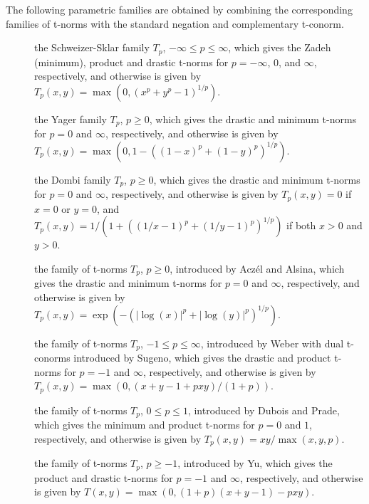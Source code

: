\documentclass[article]{jss}
\newcommand{\eqn}[1]{$#1$}
\begin{document}
\begin{appendix}
  \noindent The following parametric families are obtained by combining the
  corresponding families of t-norms with the standard negation and
  complementary t-conorm.

  \begin{description}
  \item[]{the Schweizer-Sklar family
      \eqn{T_p}, \eqn{-\infty \le p \le \infty}, which
      gives the Zadeh (minimum), product and drastic t-norms for
      \eqn{p = -\infty}, \eqn{0}, and \eqn{\infty},
      respectively, and otherwise is given by
      \eqn{T_p(x, y) = \max(0, (x^p + y^p - 1)^{1/p})}.}
  \item[]{the Yager family \eqn{T_p}, \eqn{p \ge 0},
      which gives the drastic and minimum t-norms for \eqn{p = 0}
      and \eqn{\infty}, respectively, and otherwise is given by
      \eqn{T_p(x, y) = \max(0, 1 - ((1-x)^p + (1-y)^p)^{1/p})}.}
  \item[]{the Dombi family \eqn{T_p}, \eqn{p \ge 0},
      which gives the drastic and minimum t-norms for \eqn{p = 0}
      and \eqn{\infty}, respectively, and otherwise is given by
      \eqn{T_p(x, y) = 0} if \eqn{x = 0} or \eqn{y = 0}, and
      \eqn{T_p(x, y) = 1 / (1 + ((1/x - 1)^p + (1/y - 1)^p)^{1/p})} if
      both \eqn{x > 0} and \eqn{y > 0}.}
  \item[]{the family of t-norms \eqn{T_p},
      \eqn{p \ge 0}, introduced by Acz{\'e}l and Alsina, which gives the
      drastic and minimum t-norms for \eqn{p = 0} and
      \eqn{\infty}, respectively, and otherwise is given by
      \eqn{T_p(x, y) = \exp(-(|\log(x)|^p + |\log(y)|^p)^{1/p})}.}
  \item[]{the family of t-norms \eqn{T_p},
      \eqn{-1 \le p \le \infty}, introduced by Weber
      with dual t-conorms introduced by Sugeno, which gives the
      drastic and product t-norms for \eqn{p = -1} and
      \eqn{\infty}, respectively, and otherwise is given by
      \eqn{T_p(x, y) = \max(0, (x + y - 1 + pxy) / (1 + p))}.}
  \item[]{the family of t-norms \eqn{T_p},
      \eqn{0 \le p \le 1}, introduced by Dubois and Prade, which gives
      the minimum and product t-norms for \eqn{p = 0} and \eqn{1},
      respectively, and otherwise is given by
      \eqn{T_p(x, y) = xy / \max(x, y, p)}.}
  \item[]{the family of t-norms \eqn{T_p}, \eqn{p \ge -1},
      introduced by Yu, which gives the product and drastic t-norms for
      \eqn{p = -1} and \eqn{\infty}, respectively, and otherwise is
      given by \eqn{T(x, y) = \max(0, (1 + p) (x + y - 1) - p x y)}.}
  \end{description}

\end{appendix}
\end{document}
